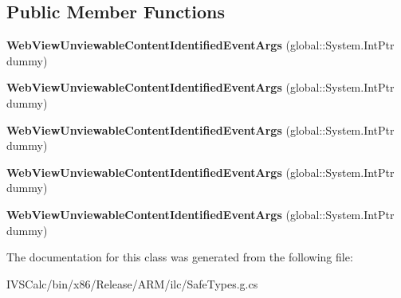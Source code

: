 \subsection*{Public Member Functions}
\begin{DoxyCompactItemize}
\item 
\mbox{\label{class_windows_1_1_u_i_1_1_xaml_1_1_controls_1_1_web_view_unviewable_content_identified_event_args_ad21ce88093f3d7af4676bcc5b0053ac2}} 
{\bfseries Web\+View\+Unviewable\+Content\+Identified\+Event\+Args} (global\+::\+System.\+Int\+Ptr dummy)
\item 
\mbox{\label{class_windows_1_1_u_i_1_1_xaml_1_1_controls_1_1_web_view_unviewable_content_identified_event_args_ad21ce88093f3d7af4676bcc5b0053ac2}} 
{\bfseries Web\+View\+Unviewable\+Content\+Identified\+Event\+Args} (global\+::\+System.\+Int\+Ptr dummy)
\item 
\mbox{\label{class_windows_1_1_u_i_1_1_xaml_1_1_controls_1_1_web_view_unviewable_content_identified_event_args_ad21ce88093f3d7af4676bcc5b0053ac2}} 
{\bfseries Web\+View\+Unviewable\+Content\+Identified\+Event\+Args} (global\+::\+System.\+Int\+Ptr dummy)
\item 
\mbox{\label{class_windows_1_1_u_i_1_1_xaml_1_1_controls_1_1_web_view_unviewable_content_identified_event_args_ad21ce88093f3d7af4676bcc5b0053ac2}} 
{\bfseries Web\+View\+Unviewable\+Content\+Identified\+Event\+Args} (global\+::\+System.\+Int\+Ptr dummy)
\item 
\mbox{\label{class_windows_1_1_u_i_1_1_xaml_1_1_controls_1_1_web_view_unviewable_content_identified_event_args_ad21ce88093f3d7af4676bcc5b0053ac2}} 
{\bfseries Web\+View\+Unviewable\+Content\+Identified\+Event\+Args} (global\+::\+System.\+Int\+Ptr dummy)
\end{DoxyCompactItemize}


The documentation for this class was generated from the following file\+:\begin{DoxyCompactItemize}
\item 
I\+V\+S\+Calc/bin/x86/\+Release/\+A\+R\+M/ilc/Safe\+Types.\+g.\+cs\end{DoxyCompactItemize}
